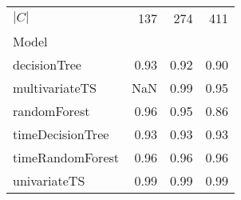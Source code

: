\begin{tabular}{lrrr}
\toprule
$|C|$ & 137 & 274 & 411 \\
Model &  &  &  \\
\midrule
decisionTree & 0.93 & 0.92 & 0.90 \\
multivariateTS & NaN & 0.99 & 0.95 \\
randomForest & 0.96 & 0.95 & 0.86 \\
timeDecisionTree & 0.93 & 0.93 & 0.93 \\
timeRandomForest & 0.96 & 0.96 & 0.96 \\
univariateTS & 0.99 & 0.99 & 0.99 \\
\bottomrule
\end{tabular}
